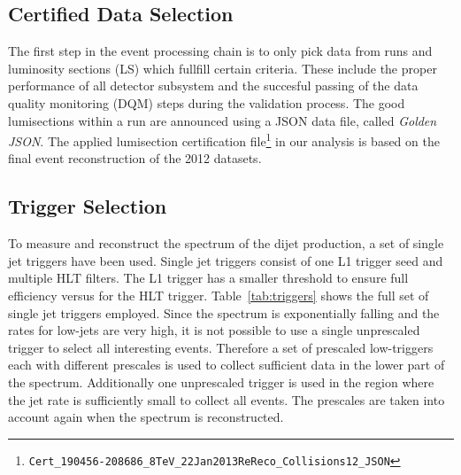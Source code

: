 \subsection{Certified Data Selection}

The first step in the event processing chain is to only pick data from runs and
luminosity sections (LS) which fullfill certain criteria. These include the
proper performance of all detector subsystem and the succesful passing of the
data quality monitoring (DQM) steps during the validation process. The good
lumisections within a run are announced using a JSON data file, called
\textit{Golden JSON}. The applied lumisection certification
file\footnote{\texttt{Cert\_190456-208686\_8TeV\_22Jan2013ReReco\_Collisions12\_JSON}}
in our analysis is based on the final event reconstruction of the 2012 datasets.

\subsection{Trigger Selection}

To measure and reconstruct the \ptavg spectrum of the dijet production, a set of
single jet triggers have been used. Single jet triggers consist of one L1
trigger seed and multiple HLT filters. The L1 trigger has a smaller threshold to
ensure full efficiency versus \pt for the HLT trigger. Table~\ref{tab:triggers}
shows the full set of single jet triggers employed. Since the \pt spectrum is
exponentially falling and the rates for low-\pt jets are very high, it is not
possible to use a single unprescaled trigger to select all interesting events.
Therefore a set of prescaled low-\pt triggers each with different prescales is
used to collect sufficient data in the lower part of the \pt spectrum.
Additionally one unprescaled trigger is used in the region where the jet rate is
sufficiently small to collect all events. The prescales are taken into account
again when the spectrum is reconstructed. 


